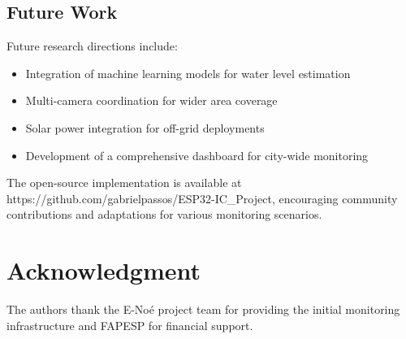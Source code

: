 \documentclass[conference]{IEEEtran}
\begin{document}
\subsection{Future Work}

Future research directions include:
\begin{itemize}
\item Integration of machine learning models for water level estimation
\item Multi-camera coordination for wider area coverage
\item Solar power integration for off-grid deployments
\item Development of a comprehensive dashboard for city-wide monitoring
\end{itemize}

The open-source implementation is available at https://github.com/gabrielpassos/ESP32-IC\_Project, encouraging community contributions and adaptations for various monitoring scenarios.

\section*{Acknowledgment}

The authors thank the E-Noé project team for providing the initial monitoring infrastructure and FAPESP for financial support.
\end{document}
